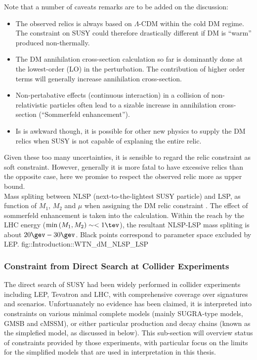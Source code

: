 Note that a number of caveats remarks are to be added on the discussion:
\begin{itemize}
\item The observed relics is always based on $\Lambda$-CDM within the cold DM regime. The constraint on SUSY could therefore drastically different if DM is ``warm'' produced non-thermally. \\
\item The DM annihilation cross-section calculation so far is dominantly done at the lowest-order (LO) in the perturbation. The contribution of higher order terms will generally increase annihilation cross-section. 
\item Non-pertabative effects (continuous interaction) in a collision of non-relativistic particles often lead to a sizable increase in annihilation cross-section (``Sommerfeld enhancement''). 
\item Is is awkward though, it is possible for other new physics to supply the DM relics when SUSY is not capable of explaning the entire relic.
\end{itemize}
Given these too many uncertainties, it is sensible to regard the relic constraint as soft constraint. However, generally it is more fatal to have excessive relics than the opposite case, here we promise to respect the observed relic more as upper bound. \\

{Mass spliting between NLSP (next-to-the-lightest SUSY particle) and LSP, as function of $M_1$, $M_2$ and $\mu$ when assigning the DM relic constraint \cite{Bramante2016}. The effect of sommerfeld enhancement is taken into the calculation. Within the reach by the LHC energy ($\min{(M_1,M_2)}\sim <1\tev$), the resultant NLSP-LSP mass spliting is about $20\gev-30\gev$. Black points correspond to parameter space excluded by LEP.}
{fig::Introduction::WTN_dM_NLSP_LSP}

			
\subsubsection{Constraint from Direct Search at Collider Experiments} 
The direct search of SUSY had been widely performed in collider experiments including LEP, Tevatron and LHC, with comprehensive coverage over signatures and scenarios. 
Unfortuanately no evidence has been claimed, it is interpreted into constraints on various minimal complete models (mainly SUGRA-type models, GMSB and cMSSM), or either particular production and decay chains (known as the simplefied model, as discussed in below).
This sub-section will overview status of constraints provided by those experiments,
with particular focus on the limits for the simplified models 
that are used in interpretation in this thesis. \\

